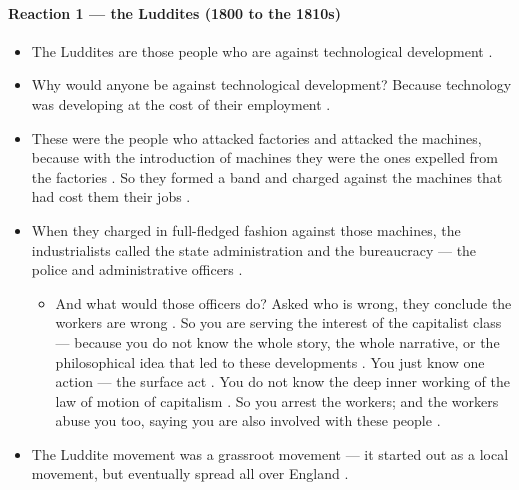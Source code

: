\paragraph{Reaction 1 --- the Luddites (1800 to the 1810s)}
\begin{itemize}
    \item The Luddites are those people who are against technological development .
    \item Why would anyone be against technological development? Because technology was developing at the cost of their employment .
    \item These were the people who attacked factories and attacked the machines, because with the introduction of machines they were the ones expelled from the factories . So they formed a band and charged against the machines that had cost them their jobs .
    \item When they charged in full-fledged fashion against those machines, the industrialists called the state administration and the bureaucracy --- the police and administrative officers .
    \begin{itemize}
        \item And what would those officers do? Asked who is wrong, they conclude the workers are wrong . So you are serving the interest of the capitalist class --- because you do not know the whole story, the whole narrative, or the philosophical idea that led to these developments . You just know one action --- the surface act . You do not know the deep inner working of the law of motion of capitalism . So you arrest the workers; and the workers abuse you too, saying you are also involved with these people .
    \end{itemize}
    \item The Luddite movement was a grassroot movement --- it started out as a local movement, but eventually spread all over England .
\end{itemize}

